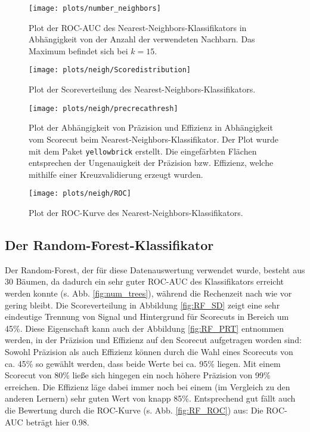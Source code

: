 \begin{figure}
	\centering
	\texttt{[image: plots/number\_neighbors]}
	\caption{Plot der ROC-AUC des Nearest-Neighbors-Klassifikators in Abhängigkeit von der Anzahl der verwendeten Nachbarn. Das Maximum befindet sich bei $k = 15$.}
	\label{fig:num_neigh}
\end{figure}


\begin{figure}
	\centering
	\texttt{[image: plots/neigh/Scoredistribution]}
	\caption{Plot der Scoreverteilung des Nearest-Neighbors-Klassifikators.}
	\label{fig:NN_SD}
\end{figure}

\begin{figure}
	\centering
	\texttt{[image: plots/neigh/precrecathresh]}
	\caption{Plot der Abhängigkeit von Präzision und Effizienz in Abhängigkeit vom Scorecut beim Nearest-Neighbors-Klassifikator. Der Plot wurde mit dem Paket \texttt{yellowbrick} \cite{yellowbrick} erstellt. Die eingefärbten Flächen entsprechen der Ungenauigkeit der Präzision bzw. Effizienz, welche mithilfe einer Kreuzvalidierung erzeugt wurden.}
	\label{fig:NN_PRT}
\end{figure}


\begin{figure}
	\centering
	\texttt{[image: plots/neigh/ROC]}
	\caption{Plot der ROC-Kurve des Nearest-Neighbors-Klassifikators.}
	\label{fig:NN_ROC}
\end{figure}



\subsection{Der Random-Forest-Klassifikator}

Der Random-Forest, der für diese Datenauswertung verwendet wurde, besteht aus 30 Bäumen, da dadurch ein sehr guter ROC-AUC des Klassifikators erreicht werden konnte (s. Abb. \ref{fig:num_trees}), während die Rechenzeit nach wie vor gering bleibt. Die Scoreverteilung in Abbildung \ref{fig:RF_SD} zeigt eine sehr eindeutige Trennung von Signal und Hintergrund für Scorecuts in Bereich um 45\%. Diese Eigenschaft kann auch der Abbildung \ref{fig:RF_PRT} entnommen werden, in der Präzision und Effizienz auf den Scorecut aufgetragen worden sind: Sowohl Präzision als auch Effizienz können durch die Wahl eines Scorecuts von ca. 45\% so gewählt werden, dass beide Werte bei ca. 95\% liegen. Mit einem Scorecut von 80\% ließe sich hingegen ein noch höhere Präzision von 99\% erreichen. Die Effizienz läge dabei immer noch bei einem (im Vergleich zu den anderen Lernern) sehr guten Wert von knapp 85\%. Entsprechend gut fällt auch die Bewertung durch die ROC-Kurve (s. Abb. \ref{fig:RF_ROC}) aus: Die ROC-AUC beträgt hier 0.98.

